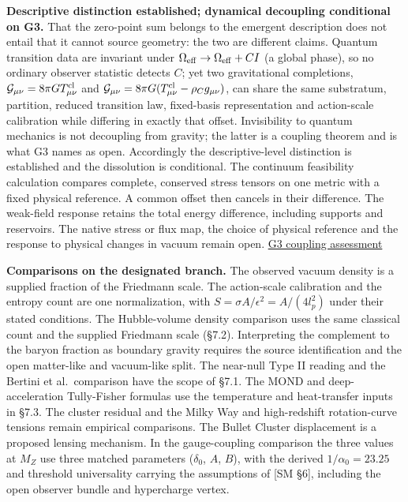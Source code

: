 \documentclass[
]{article}
\begin{document}
\textbf{Descriptive distinction established; dynamical decoupling
conditional on G3.} That the zero-point sum belongs to the emergent
description does not entail that it cannot source geometry: the two are
different claims. Quantum transition data are invariant under
\(\Omega_{\rm eff}\to\Omega_{\rm eff}+CI\) (a global phase), so no
ordinary observer statistic detects \(C\); yet two gravitational
completions, \(\mathcal G_{\mu\nu}=8\pi G T^{\rm cl}_{\mu\nu}\) and
\(\mathcal G_{\mu\nu}=8\pi G(T^{\rm cl}_{\mu\nu}-\rho_Cg_{\mu\nu})\),
can share the same substratum, partition, reduced transition law,
fixed-basis representation and action-scale calibration while differing
in exactly that offset. Invisibility to quantum mechanics is not
decoupling from gravity; the latter is a coupling theorem and is what G3
names as open. Accordingly the descriptive-level distinction is
established and the dissolution is conditional. The continuum
feasibility calculation compares complete, conserved stress tensors on
one metric with a fixed physical reference. A common offset then cancels
in their difference. The weak-field response retains the total energy
difference, including supports and reservoirs. The native stress or flux
map, the choice of physical reference and the response to physical
changes in vacuum remain open.
\href{../verification/programmes/gravity/drafts/g3-coupling-feasibility-20261118/G3-COUPLING-FEASIBILITY.md}{G3
coupling assessment}

\textbf{Comparisons on the designated branch.} The observed vacuum
density is a supplied fraction of the Friedmann scale. The action-scale
calibration and the entropy count are one normalization, with
\(S=\sigma A/\epsilon^2=A/(4l_p^2)\) under their stated conditions. The
Hubble-volume density comparison uses the same classical count and the
supplied Friedmann scale (§7.2). Interpreting the complement to the
baryon fraction as boundary gravity requires the source identification
and the open matter-like and vacuum-like split. The near-null Type II
reading and the Bertini et al.~comparison have the scope of §7.1. The
MOND and deep-acceleration Tully-Fisher formulas use the temperature and
heat-transfer inputs in §7.3. The cluster residual and the Milky Way and
high-redshift rotation-curve tensions remain empirical comparisons. The
Bullet Cluster displacement is a proposed lensing mechanism. In the
gauge-coupling comparison the three values at \(M_Z\) use three matched
parameters (\(\delta_0\), \(A\), \(B\)), with the derived
\(1/\alpha_0=23.25\) and threshold universality carrying the assumptions
of {[}SM §6{]}, including the open observer bundle and hypercharge
vertex.
\end{document}
